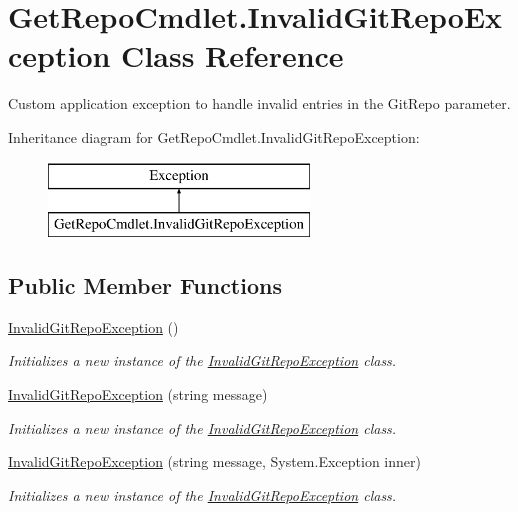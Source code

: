 \hypertarget{class_get_repo_cmdlet_1_1_invalid_git_repo_exception}{}\section{Get\+Repo\+Cmdlet.\+Invalid\+Git\+Repo\+Exception Class Reference}
\label{class_get_repo_cmdlet_1_1_invalid_git_repo_exception}


Custom application exception to handle invalid entries in the Git\+Repo parameter.  


Inheritance diagram for Get\+Repo\+Cmdlet.\+Invalid\+Git\+Repo\+Exception\+:\begin{figure}[H]
\begin{center}
\leavevmode
\includegraphics[height=2.000000cm]{class_get_repo_cmdlet_1_1_invalid_git_repo_exception}
\end{center}
\end{figure}
\subsection*{Public Member Functions}
\begin{DoxyCompactItemize}
\item 
\mbox{\hyperlink{class_get_repo_cmdlet_1_1_invalid_git_repo_exception_a806265e644c40f10548f065775b3ff6f}{Invalid\+Git\+Repo\+Exception}} ()
\begin{DoxyCompactList}\small\item\em Initializes a new instance of the \mbox{\hyperlink{class_get_repo_cmdlet_1_1_invalid_git_repo_exception}{Invalid\+Git\+Repo\+Exception}} class. \end{DoxyCompactList}\item 
\mbox{\hyperlink{class_get_repo_cmdlet_1_1_invalid_git_repo_exception_a14241ad466219ffb1c58e0e558397736}{Invalid\+Git\+Repo\+Exception}} (string message)
\begin{DoxyCompactList}\small\item\em Initializes a new instance of the \mbox{\hyperlink{class_get_repo_cmdlet_1_1_invalid_git_repo_exception}{Invalid\+Git\+Repo\+Exception}} class. \end{DoxyCompactList}\item 
\mbox{\hyperlink{class_get_repo_cmdlet_1_1_invalid_git_repo_exception_a7c08597e5771ae9c41171ddc486b746f}{Invalid\+Git\+Repo\+Exception}} (string message, System.\+Exception inner)
\begin{DoxyCompactList}\small\item\em Initializes a new instance of the \mbox{\hyperlink{class_get_repo_cmdlet_1_1_invalid_git_repo_exception}{Invalid\+Git\+Repo\+Exception}} class. \end{DoxyCompactList}\end{DoxyCompactItemize}


